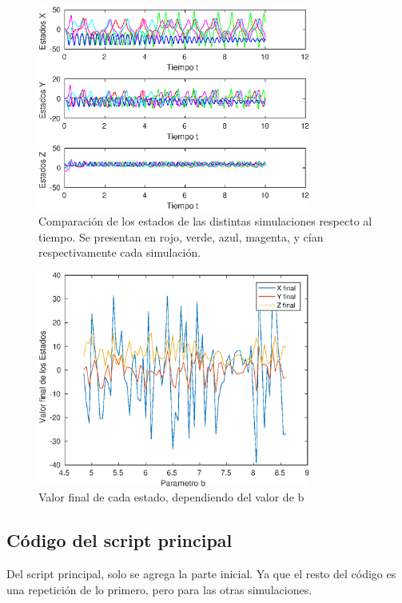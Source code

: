 \documentclass[12pt,letterpaper]{article}
\begin{document}

\begin{figure}
	\centering
	\includegraphics[width=0.8\textwidth]{pictures/comparacion}
	\caption{Comparación de los estados de las distintas simulaciones respecto al tiempo. Se presentan en rojo, verde, azul, magenta, y cían respectivamente cada simulación.}

	\label{fig:comparacion}
\end{figure}



\begin{figure}
	\centering
	\includegraphics[width=0.8\textwidth]{pictures/sensibilidad}
	\caption{Valor final de cada estado, dependiendo del valor de b}
	\label{fig:sensibilidad}
\end{figure}

\subsection{Código del script principal}
 Del script principal, solo se agrega la parte inicial. Ya que el resto del código es una repetición de lo primero, pero para las otras simulaciones.
 
 
\end{document}
